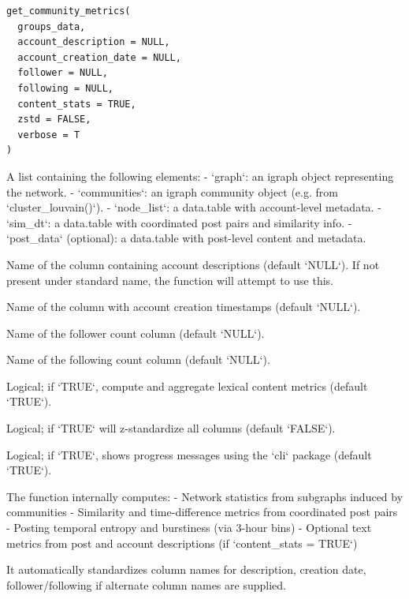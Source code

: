 \documentclass[a4paper]{book}
\begin{document}
%
\begin{Usage}
\begin{verbatim}
get_community_metrics(
  groups_data,
  account_description = NULL,
  account_creation_date = NULL,
  follower = NULL,
  following = NULL,
  content_stats = TRUE,
  zstd = FALSE,
  verbose = T
)
\end{verbatim}
\end{Usage}
%
\begin{Arguments}
\begin{ldescription}
\item[\code{groups\_data}] A list containing the following elements:
- `graph`: an igraph object representing the network.
- `communities`: an igraph community object (e.g. from `cluster\_louvain()`).
- `node\_list`: a data.table with account-level metadata.
- `sim\_dt`: a data.table with coordinated post pairs and similarity info.
- `post\_data` (optional): a data.table with post-level content and metadata.

\item[\code{account\_description}] Name of the column containing account descriptions (default `NULL`). 
If not present under standard name, the function will attempt to use this.

\item[\code{account\_creation\_date}] Name of the column with account creation timestamps (default `NULL`).

\item[\code{follower}] Name of the follower count column (default `NULL`).

\item[\code{following}] Name of the following count column (default `NULL`).

\item[\code{content\_stats}] Logical; if `TRUE`, compute and aggregate lexical content metrics (default `TRUE`).

\item[\code{zstd}] Logical; if `TRUE` will z-standardize all columns (default `FALSE`).

\item[\code{verbose}] Logical; if `TRUE`, shows progress messages using the `cli` package (default `TRUE`).
\end{ldescription}
\end{Arguments}
%
\begin{Details}
The function internally computes:
- Network statistics from subgraphs induced by communities
- Similarity and time-difference metrics from coordinated post pairs
- Posting temporal entropy and burstiness (via 3-hour bins)
- Optional text metrics from post and account descriptions (if `content\_stats = TRUE`)

It automatically standardizes column names for description, creation date,
follower/following if alternate column names are supplied.
\end{Details}
\end{document}
